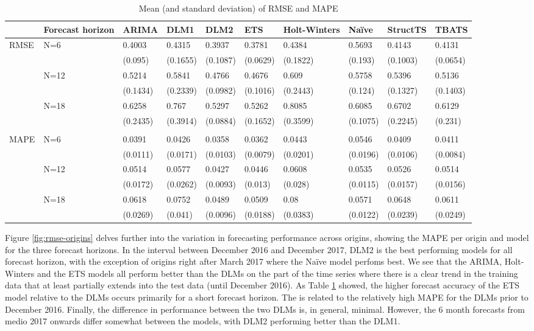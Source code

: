 \documentclass[12pt, a4paper]{article}
\begin{document}
\begin{table}[H]
\caption{\label{tab:error-comparison}Mean (and standard deviation) of RMSE and MAPE}
\centering
\small
\hspace*{-1cm}
\begin{tabular}{p{0.9cm}p{1.0cm}p{1.2cm}p{1.2cm}p{1.2cm}p{1.2cm}p{1.2cm}p{1.2cm}p{1.2cm}p{1.2cm}}
\toprule
 & Forecast horizon & ARIMA & DLM1 & DLM2 & ETS & Holt-Winters & Naïve & StructTS & TBATS\\
\midrule
RMSE & N=6 & 0.4003 & 0.4315 & 0.3937 & 0.3781 & 0.4384 & 0.5693 & 0.4143 & 0.4131\\
 &  & (0.095) & (0.1655) & (0.1087) & (0.0629) & (0.1822) & (0.193) & (0.1003) & (0.0654)\\
 & N=12 & 0.5214 & 0.5841 & 0.4766 & 0.4676 & 0.609 & 0.5758 & 0.5396 & 0.5136\\
 &  & (0.1434) & (0.2339) & (0.0982) & (0.1016) & (0.2443) & (0.124) & (0.1327) & (0.1403)\\
 & N=18 & 0.6258 & 0.767 & 0.5297 & 0.5262 & 0.8085 & 0.6085 & 0.6702 & 0.6129\\
 &  & (0.2435) & (0.3914) & (0.0884) & (0.1652) & (0.3599) & (0.1075) & (0.2245) & (0.231)\\
 &  &  &  &  &  &  &  &  & \\
MAPE & N=6 & 0.0391 & 0.0426 & 0.0358 & 0.0362 & 0.0443 & 0.0546 & 0.0409 & 0.0411\\
 &  & (0.0111) & (0.0171) & (0.0103) & (0.0079) & (0.0201) & (0.0196) & (0.0106) & (0.0084)\\
 & N=12 & 0.0514 & 0.0577 & 0.0427 & 0.0446 & 0.0608 & 0.0535 & 0.0526 & 0.0514\\
 &  & (0.0172) & (0.0262) & (0.0093) & (0.013) & (0.028) & (0.0115) & (0.0157) & (0.0156)\\
 & N=18 & 0.0618 & 0.0752 & 0.0489 & 0.0509 & 0.08 & 0.0571 & 0.0648 & 0.0611\\
 &  & (0.0269) & (0.041) & (0.0096) & (0.0188) & (0.0383) & (0.0122) & (0.0239) & (0.0249)\\
\bottomrule
\end{tabular}
\end{table}


Figure \ref{fig:rmse-origins} delves further into the variation in
forecasting performance across origins, showing the MAPE per origin and
model for the three forecast horizons. In the interval between December
2016 and December 2017, DLM2 is the best performing models for all forecast horizon, with the exception of origins right after March
2017 where the Naïve model perfoms best. We see that the ARIMA,
Holt-Winters and the ETS models all perform better than the DLMs on the
part of the time series where there is a clear trend in the training
data that at least partially extends into the test data (until December
2016). As Table \ref{tab:error-comparison} showed, the higher forecast
accuracy of the ETS model relative to the DLMs occurs primarily for a
short forecast horizon. The is related to the relatively high MAPE for the DLMs prior to
December 2016. Finally, the difference in performance between the two
DLMs is, in general, minimal. However, the 6 month forecasts from medio
2017 onwards differ somewhat between the models, with DLM2 performing
better than the DLM1.
\end{document}
